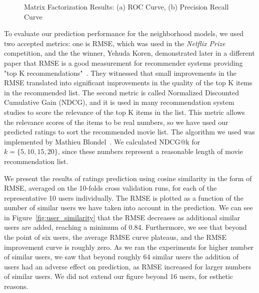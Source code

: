 \begin{figure}
{\begin{tabular}{c c}
\end{tabular}
}
\caption{Matrix Factorization Results: (a) ROC Curve, (b) Precision Recall Curve}
\label{fig:matrix_curves}  
\end{figure}


To evaluate our prediction performance for the neighborhood models, we used two accepted metrics: one is RMSE, which was used in the \textit{Netflix Prize} competition, and the the winner, Yehuda Koren, demonstrated later in a different paper that RMSE is a good measurement for recommender systems providing "top K recommendations"~\cite{koren2008factorization}. They witnessed that small improvements in the RMSE translated into significant improvements in the quality of the top K items in the recommended list. The second metric is called Normalized Discounted Cumulative Gain (NDCG), and it is used in many recommendation system studies to score the relevance of the top K items in the list. This metric allows the relevance scores of the items to be real numbers, so we have used our predicted ratings to sort the recommended movie list. The algorithm we used was implemented by Mathieu Blondel~\cite{letorMetrics}. We calculated NDCG@k for $k=\{5, 10, 15, 20\}$, since these numbers represent a reasonable length of movie recommendation list.

We present the results of ratings prediction using cosine similarity in the form of RMSE, averaged on the 10-folds cross validation runs, for each of the representative 10 users individually. 
The RMSE is plotted as a function of the number of similar users we have taken into account in the prediction. 
We can see in Figure~\ref{fig:user_similarity} that the RMSE decreases as additional similar users are added, reaching a minimum of 0.84.
Furthermore, we see that beyond the point of six users, the average RMSE curve plateaus, and the RMSE improvement curve is roughly zero.
As we ran the experiments for higher number of similar users, we saw that beyond roughly 64 similar users the addition of users had an adverse effect on prediction, as RMSE increased for larger numbers of similar users. We did not extend our figure beyond 16 users, for esthetic reasons. 

